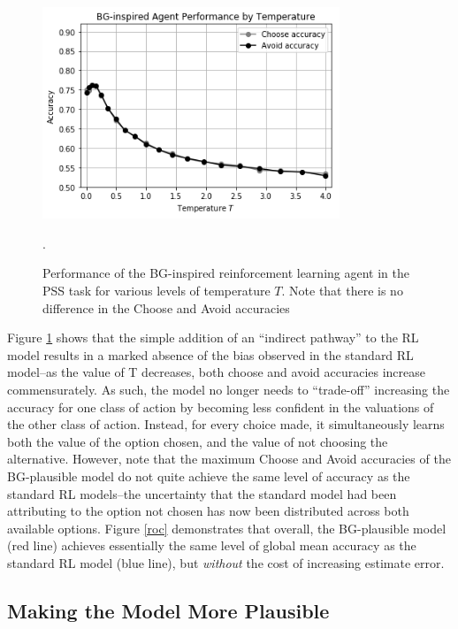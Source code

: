 \documentclass[10pt,letterpaper]{article}
\begin{document}
\begin{figure}[ht]
	\begin{center}
		\includegraphics[width=3.5in]{bg-agent-performance.png}
	\end{center}
	\caption{Performance of the BG-inspired reinforcement learning agent in the PSS task for various levels of temperature $T$. Note that there is no difference in the Choose and Avoid accuracies}.
	\label{bg-agents}
\end{figure}

Figure \ref{bg-agents} shows that the simple addition of an ``indirect pathway'' to the RL model results in a marked absence of the bias observed in the standard RL model--as the value of T decreases, both choose and avoid accuracies increase commensurately. As such, the model no longer needs to ``trade-off'' increasing the accuracy for one class of action by becoming less confident in the valuations of the other class of action. Instead, for every choice made, it simultaneously learns both the value of the option chosen, and the value of not choosing the alternative. However, note that the maximum Choose and Avoid accuracies of the BG-plausible model do not quite achieve the same level of accuracy as the standard RL models--the uncertainty that the standard model had been attributing to the option not chosen has now been distributed across both available options.  Figure \ref{roc} demonstrates that overall, the BG-plausible model (red line) achieves essentially the same level of global mean accuracy as the standard RL model (blue line), but \emph{without} the cost of increasing estimate error.  


\subsection{Making the Model More Plausible}
\end{document}
